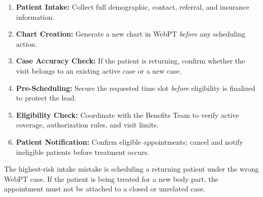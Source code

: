 \documentclass[11pt,a4paper]{article}
\begin{document}
\begin{tcolorbox}[successbox,title={Front Line SOP --- Sequential Steps}]
\begin{enumerate}
  \item \textbf{Patient Intake:} Collect full demographic, contact, referral, and insurance information.
  \item \textbf{Chart Creation:} Generate a new chart in WebPT \emph{before} any scheduling action.
  \item \textbf{Case Accuracy Check:} If the patient is returning, confirm whether the visit belongs to an existing active case or a new case.
  \item \textbf{Pre-Scheduling:} Secure the requested time slot \emph{before} eligibility is finalized to protect the lead.
  \item \textbf{Eligibility Check:} Coordinate with the Benefits Team to verify active coverage, authorization rules, and visit limits.
  \item \textbf{Patient Notification:} Confirm eligible appointments; cancel and notify ineligible patients before treatment occurs.
\end{enumerate}
\end{tcolorbox}

\begin{tcolorbox}[dangerbox,title={Front Line Billing Control Point}]
The highest-risk intake mistake is scheduling a returning patient under the wrong WebPT case.
If the patient is being treated for a new body part, the appointment must not be attached to a closed or unrelated case.
\end{tcolorbox}

\vspace{0.4em}
\begin{center}
\end{center}
\end{document}
